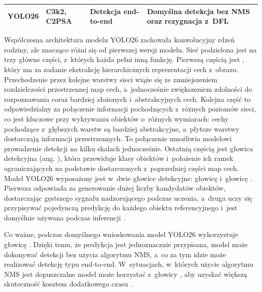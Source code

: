 \begin{table}[h!]
\begin{tabularx}{\textwidth}{
        >{\raggedright\arraybackslash}p{2.5cm}
        >{\raggedright\arraybackslash}X
        >{\raggedright\arraybackslash}X
        >{\raggedright\arraybackslash}X
        }
        YOLO26                                       &
        C3k2, C2PSA                                  &
        Detekcja end-to-end                          &
        Domyślna detekcja bez NMS oraz rezygnacja z~DFL                            \\

        \bottomrule
    \end{tabularx}
\end{table}



Współczesna architektura modelu YOLO26 zachowała konwolucyjny rdzeń rodziny, ale znacząco różni się od pierwszej wersji modelu. Sieć podzielona jest na trzy główne części, z~których każda pełni inną funkcję. Pierwszą częścią jest , który ma za zadanie ekstrakcję hierarchicznych reprezentacji cech z~obrazu. Przechodzenie przez kolejne warstwy sieci wiąże się ze zmniejszeniem rozdzielczości przestrzennej map cech, a~jednocześnie zwiększeniem zdolności do rozpoznawania coraz bardziej złożonych i~abstrakcyjnych cech. Kolejna część to  odpowiedzialny za połączenie informacji pochodzących z~różnych poziomów sieci, co jest kluczowe przy wykrywaniu obiektów o~różnych wymiarach: cechy pochodzące z~głębszych warstw są bardziej abstrakcyjne, a~płytsze warstwy dostarczają informacji przestrzennych. To połączenie umożliwia modelowi prowadzenie detekcji na kilku skalach jednocześnie. Ostatnią częścią jest głowica detekcyjna (ang. ), która przewiduje klasy obiektów i~położenie ich ramek ograniczających na podstawie dostarczonych z~poprzedniej części map cech. Model YOLO26 wyposażony jest w~dwie głowice detekcyjne: głowicę  i~głowicę . Pierwsza odpowiada za generowanie dużej liczby kandydatów obiektów, dostarczając gęstszego sygnału nadzorującego podczas uczenia, a~druga uczy się przypisywać pojedynczą predykcję do każdego obiektu referencyjnego i~jest domyślnie używana podczas inferencji \cite{bib:jocher2026ultralyticsyolo26}.

Co ważne, podczas domyślnego wnioskowania model YOLO26 wykorzystuje głowicę . Dzięki temu, że predykcja jest jednoznacznie przypisana, model może dokonywać detekcji bez użycia algorytmu NMS, a~co za tym idzie może realizować detekcję typu end-to-end. W~sytuacjach, w~których użycie algorytmu NMS jest dopuszczalne model może korzystać z~głowicy , aby uzyskać większą skuteczność kosztem dodatkowego czasu \cite{bib:jocher2026ultralyticsyolo26}.


